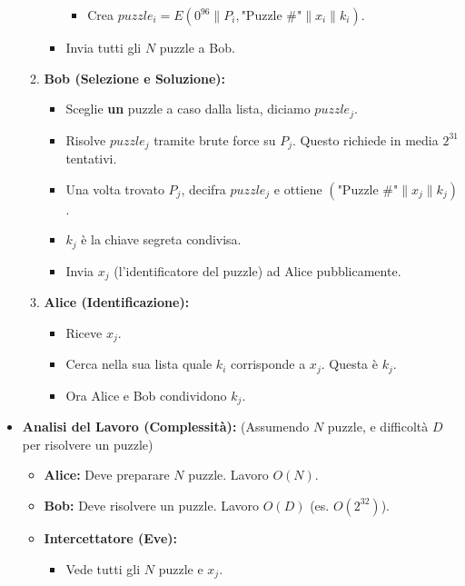 \documentclass{article}
\begin{document}
\begin{itemize}
\begin{enumerate}
\begin{itemize}
\begin{itemize}
                            \item Crea $puzzle_i = E(0^{96} \parallel P_i, \text{"Puzzle \#"} \parallel x_i \parallel k_i)$.
                        \end{itemize}
                    \item Invia tutti gli $N$ puzzle a Bob.
                \end{itemize}
            \item \textbf{Bob (Selezione e Soluzione):}
                \begin{itemize}
                    \item Sceglie \textbf{un} puzzle a caso dalla lista, diciamo $puzzle_j$.
                    \item Risolve $puzzle_j$ tramite brute force su $P_j$. Questo richiede in media $2^{31}$ tentativi.
                    \item Una volta trovato $P_j$, decifra $puzzle_j$ e ottiene $(\text{"Puzzle \#"} \parallel x_j \parallel k_j)$.
                    \item $k_j$ è la chiave segreta condivisa.
                    \item Invia $x_j$ (l'identificatore del puzzle) ad Alice pubblicamente.
                \end{itemize}
            \item \textbf{Alice (Identificazione):}
                \begin{itemize}
                    \item Riceve $x_j$.
                    \item Cerca nella sua lista quale $k_i$ corrisponde a $x_j$. Questa è $k_j$.
                    \item Ora Alice e Bob condividono $k_j$.
                \end{itemize}
        \end{enumerate}
    \item \textbf{Analisi del Lavoro (Complessità):} (Assumendo $N$ puzzle, e difficoltà $D$ per risolvere un puzzle)
        \begin{itemize}
            \item \textbf{Alice:} Deve preparare $N$ puzzle. Lavoro $O(N)$.
            \item \textbf{Bob:} Deve risolvere un puzzle. Lavoro $O(D)$ (es. $O(2^{32})$).
            \item \textbf{Intercettatore (Eve):}
                \begin{itemize}
                    \item Vede tutti gli $N$ puzzle e $x_j$.

\end{itemize}
\end{itemize}
\end{itemize}
\end{document}
